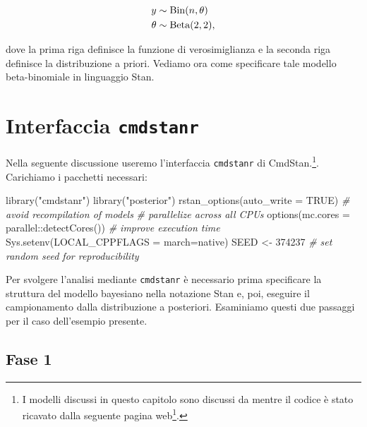 \documentclass[
  11pt,
]{krantz}
\makeatletter
\newenvironment{Shaded}{\begin{snugshade}}{\end{snugshade}}
\newcommand{\AttributeTok}[1]{\textcolor[rgb]{0.61,0.61,0.61}{#1}}
\newcommand{\CommentTok}[1]{\textcolor[rgb]{0.37,0.37,0.37}{\textit{#1}}}
\newcommand{\ConstantTok}[1]{\textcolor[rgb]{0,0,0}{#1}}
\newcommand{\DecValTok}[1]{\textcolor[rgb]{0.06,0.06,0.06}{#1}}
\newcommand{\FunctionTok}[1]{\textcolor[rgb]{0,0,0}{#1}}
\newcommand{\NormalTok}[1]{#1}
\newcommand{\OtherTok}[1]{\textcolor[rgb]{0.37,0.37,0.37}{#1}}
\newcommand{\SpecialCharTok}[1]{\textcolor[rgb]{0,0,0}{#1}}
\newcommand{\StringTok}[1]{\textcolor[rgb]{0.5,0.5,0.5}{#1}}
\renewcommand{\href}[2]{#2\footnote{\url{#1}}}
\newenvironment{kframe}{%
\medskip{}
\setlength{\fboxsep}{.8em}
 \def\at@end@of@kframe{}%
 \ifinner\ifhmode%
  \def\at@end@of@kframe{\end{minipage}}%
  \begin{minipage}{\columnwidth}%
 \fi\fi%
 \def\FrameCommand##1{\hskip\@totalleftmargin \hskip-\fboxsep
 \colorbox{shadecolor}{##1}\hskip-\fboxsep
     \hskip-\linewidth \hskip-\@totalleftmargin \hskip\columnwidth}%
 \MakeFramed {\advance\hsize-\width
   \@totalleftmargin\z@ \linewidth\hsize
   \@setminipage}}%
 {\par\unskip\endMakeFramed%
 \at@end@of@kframe}
\renewenvironment{Shaded}{\begin{kframe}}{\end{kframe}}
\theoremstyle{definition}
\theoremstyle{definition}
\theoremstyle{definition}
\theoremstyle{definition}
\theoremstyle{remark}
\makeatother
\begin{document}
\begin{align}
y &\sim \mbox{Bin}(n, \theta) \notag\\
\theta &\sim \mbox{Beta}(2, 2),
\label{eq:beta-binom-trump}
\end{align}

dove la prima riga definisce la funzione di verosimiglianza e la seconda riga definisce la distribuzione a priori. Vediamo ora come specificare tale modello beta-binomiale in linguaggio Stan.

\hypertarget{cmdstanr-gautret}{%
\section{\texorpdfstring{Interfaccia \texttt{cmdstanr}}{Interfaccia cmdstanr}}\label{cmdstanr-gautret}}

Nella seguente discussione useremo l'interfaccia \texttt{cmdstanr} di CmdStan.\footnote{I modelli discussi in questo capitolo sono discussi da \citet{gelman1995bayesian} mentre il codice è stato ricavato dalla seguente \href{http://avehtari.github.io/BDA_R_demos/demos_rstan/rstan_demo.html}{pagina web}.}. Carichiamo i pacchetti necessari:

\begin{Shaded}
\begin{Highlighting}[]
\FunctionTok{library}\NormalTok{(}\StringTok{"cmdstanr"}\NormalTok{)}
\FunctionTok{library}\NormalTok{(}\StringTok{"posterior"}\NormalTok{)}
\FunctionTok{rstan\_options}\NormalTok{(}\AttributeTok{auto\_write =} \ConstantTok{TRUE}\NormalTok{) }\CommentTok{\# avoid recompilation of models}
\CommentTok{\# parallelize across all CPUs}
\FunctionTok{options}\NormalTok{(}\AttributeTok{mc.cores =}\NormalTok{ parallel}\SpecialCharTok{::}\FunctionTok{detectCores}\NormalTok{()) }
\CommentTok{\# improve execution time}
\FunctionTok{Sys.setenv}\NormalTok{(}\AttributeTok{LOCAL\_CPPFLAGS =} \StringTok{\textquotesingle{}{-}march=native\textquotesingle{}}\NormalTok{) }
\NormalTok{SEED }\OtherTok{\textless{}{-}} \DecValTok{374237} \CommentTok{\# set random seed for reproducibility}
\end{Highlighting}
\end{Shaded}

Per svolgere l'analisi mediante \texttt{cmdstanr} è necessario prima specificare la struttura del modello bayesiano nella notazione Stan e, poi, eseguire il campionamento dalla distribuzione a posteriori. Esaminiamo questi due passaggi per il caso dell'esempio presente.

\hypertarget{fase-1}{%
\subsection{Fase 1}\label{fase-1}}
\end{document}
